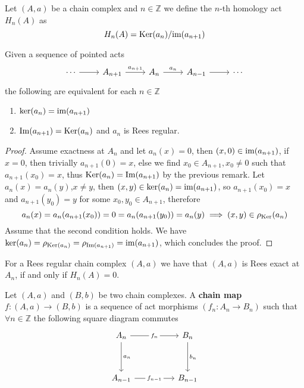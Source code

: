 \begin{definition}
    Let $(A,a)$ be a chain complex and $n\in\mathbb{Z}$ we define the $n$-th homology act $H_n(A)$ as 
    \[
        H_n(A) = \mathrm{Ker}(a_n)/\text{im}(a_{n+1})
    \]
\end{definition}
\begin{proposition}\label{regularityProp}
    Given a sequence of pointed acts 
    \[\begin{tikzcd}
        \cdots & {A_{n+1}} & {A_n} & {A_{n-1}} & \cdots
        \arrow[from=1-1, to=1-2]
        \arrow["{a_{n+1}}", from=1-2, to=1-3]
        \arrow["{a_n}", from=1-3, to=1-4]
        \arrow[from=1-4, to=1-5]
    \end{tikzcd}\]
    the following are equivalent for each $n\in\mathbb{Z}$
    \begin{enumerate}
        \item $\mathrm{ker}(a_n)=\text{im}(a_{n+1})$
        \item $\mathrm{Im}(a_{n+1})=\mathrm{Ker}(a_n)$ and $a_n$ is Rees regular.
    \end{enumerate}
\end{proposition}
\begin{proof}[Proof]
    Assume exactness at $A_n$ and let $a_n(x)=0$, then $(x,0)\in\text{im}(a_{n+1})$, if 
    $x=0$, then trivially $a_{n+1}(0)=x$, else we find $x_0\in A_{n+1},x_0\neq 0$ such that $a_{n+1}(x_0)=x$, thus
    $\mathrm{Ker}(a_n)=\mathrm{Im}(a_{n+1})$ by the previous remark. Let $a_n(x)=a_n(y)$,$x\neq y$, then $(x,y)\in\mathrm{ker}(a_n)=\text{im}(a_{n+1})$, 
    so $a_{n+1}(x_0)=x$ and $a_{n+1}(y_0)=y$ for some $x_0,y_0\in A_{n+1}$, therefore 
    \[
        a_n(x)= a_n(a_{n+1}(x_0)) = 0 = a_n(a_{n+1}(y_0)) = a_n(y) \implies (x,y)\in\rho_\mathrm{Ker}(a_n)
    \]
    Assume that the second condition holds. We have $\mathrm{ker}(a_n) = \rho_{\mathrm{Ker}(a_n)} = \rho_{\mathrm{Im}(a_{n+1})} = \text{im}(a_{n+1})$, 
    which concludes the proof.
\end{proof}
\begin{remark}
    For a Rees regular chain complex $(A,a)$ we have that $(A,a)$ is Rees exact at $A_n$, if and only if $H_n(A)=0$.
\end{remark}
\begin{definition}
    Let $(A,a)$ and $(B,b)$ be two chain complexes. A \textbf{chain map} $f:(A,a)\to(B,b)$ is a sequence of act morphisms $(f_n: A_n\to B_n)$ 
    such that $\forall n\in\mathbb{Z}$ the following square diagram commutes
    \[\begin{tikzcd}
        {A_n} && {B_n} \\
        \\
        {A_{n-1}} && {B_{n-1}}
        \arrow["{f_n}"{description}, from=1-1, to=1-3]
        \arrow["{a_n}", from=1-1, to=3-1]
        \arrow["{b_n}", from=1-3, to=3-3]
        \arrow["{f_{n-1}}"{description}, from=3-1, to=3-3]
    \end{tikzcd}\]
\end{definition}
